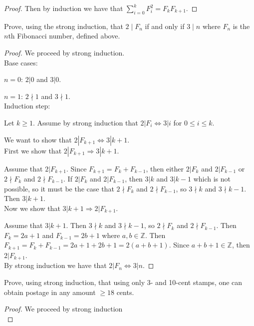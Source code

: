 \documentclass[12 pt]{exam}
\begin{document}
\begin{questions}
\begin{solution}
\begin{proof}
Then by induction we have that $\sum_{i=0}^k F_i^2 = F_k F_{k+1}$.
\end{proof}\end{solution}



\question Prove, using the strong induction, that $ 2 \mid F_n$ if and only if $3 \mid n$ where $F_n$ is the $n$th Fibonacci number, defined above. 

\begin{solution}\begin{proof}
We proceed by strong induction. \\


Base cases:

$n=0$: $2 | 0$ and $3 | 0$.

$n=1$: $2 \nmid 1$ and $3 \nmid 1$.\\


Induction step:

Let $k \ge 1$. Assume by strong induction that $2 | F_i \iff 3 | i$ for $0 \le i \le k$.

We want to show that $2 | F_{k+1} \iff 3 | k+1$.\\


First we show that $2 | F_{k+1} \Rightarrow 3|k+1$.

Assume that $2 | F_{k+1}$. Since $F_{k+1} = F_{k} + F_{k-1}$, then either $2 | F_k$ and $2 | F_{k-1}$
or $2 \nmid F_k$ and $2 \nmid F_{k-1}$. If $2 | F_k$ and $2 | F_{k-1}$, then $3 | k$ and $3 | k-1$
which is not possible, so it must be the case that $2 \nmid F_k$ and $2 \nmid F_{k-1}$,
so $3 \nmid k$ and $3 \nmid {k-1}$. Then $3 | k+1$. \\

Now we show that $3|k+1 \Rightarrow 2 | F_{k+1}$.

Assume that $3|k+1$. Then $3 \nmid k$ and $3 \nmid k-1$, so $2 \nmid F_k$ and $2 \nmid F_{k-1}$.
Then $F_k = 2a + 1$ and $F_{k-1} = 2b + 1$ where $a, b \in \mathbb{Z}$. Then
$F_{k+1} = F_k + F_{k-1} = 2a + 1 + 2b + 1 = 2(a+b+1)$. Since $a+b+1 \in \mathbb{Z}$, then $2 | F_{k+1}$.\\


By strong induction we have that $2 | F_n \iff 3 | n$.
\end{proof}\end{solution}


\question Prove, using strong induction, that using only 3- and 10-cent stamps, one can obtain postage in any amount $\ge 18$ cents.

\begin{solution}\begin{proof}
We proceed by strong induction\\


\end{proof}
\end{solution}
\end{questions}
\end{document}
